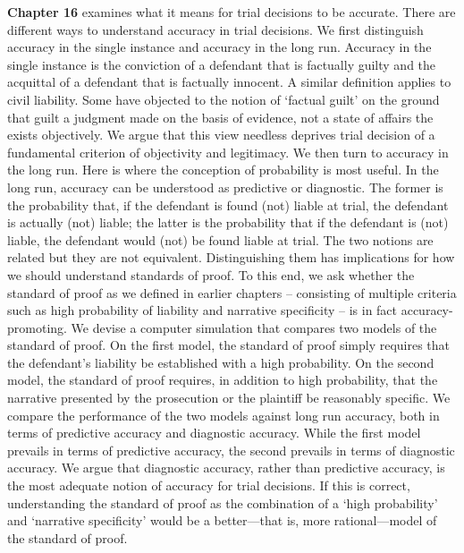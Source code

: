\documentclass[
  10pt,
  dvipsnames,enabledeprecatedfontcommands]{scrartcl}
\begin{document}
\textbf{Chapter 16} examines what it means for trial decisions to be
accurate. There are different ways to understand accuracy in trial
decisions. We first distinguish accuracy in the single instance and
accuracy in the long run. Accuracy in the single instance is the
conviction of a defendant that is factually guilty and the acquittal of
a defendant that is factually innocent. A similar definition applies to
civil liability. Some have objected to the notion of `factual guilt' on
the ground that guilt a judgment made on the basis of evidence, not a
state of affairs the exists objectively. We argue that this view
needless deprives trial decision of a fundamental criterion of
objectivity and legitimacy. We then turn to accuracy in the long run.
Here is where the conception of probability is most useful. In the long
run, accuracy can be understood as predictive or diagnostic. The former
is the probability that, if the defendant is found (not) liable at
trial, the defendant is actually (not) liable; the latter is the
probability that if the defendant is (not) liable, the defendant would
(not) be found liable at trial. The two notions are related but they are
not equivalent. Distinguishing them has implications for how we should
understand standards of proof. To this end, we ask whether the standard
of proof as we defined in earlier chapters -- consisting of multiple
criteria such as high probability of liability and narrative specificity
-- is in fact accuracy-promoting. We devise a computer simulation that
compares two models of the standard of proof. On the first model, the
standard of proof simply requires that the defendant's liability be
established with a high probability. On the second model, the standard
of proof requires, in addition to high probability, that the narrative
presented by the prosecution or the plaintiff be reasonably specific. We
compare the performance of the two models against long run accuracy,
both in terms of predictive accuracy and diagnostic accuracy. While the
first model prevails in terms of predictive accuracy, the second
prevails in terms of diagnostic accuracy. We argue that diagnostic
accuracy, rather than predictive accuracy, is the most adequate notion
of accuracy for trial decisions. If this is correct, understanding the
standard of proof as the combination of a `high probability' and
`narrative specificity' would be a better---that is, more
rational---model of the standard of proof.

\end{document}
